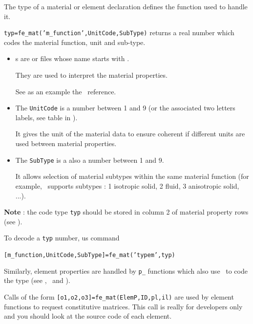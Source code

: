 
 The type of a material or element declaration defines the function used to handle it.  

{\tt typ=fe\_mat('m\_function',UnitCode,SubType)} returns a real number which codes the material function, unit and sub-type. 
\begin{itemize}
\item {}s are  or  files whose name starts with . 

They are used to interpret the material properties. 

See as an example the \melastic\ reference.

\item The {\tt UnitCode} is a number between 1 and 9 (or the associated two letters labels, see table in ). 

It gives the unit of the material data to ensure coherent if different units are used between material properties.

\item The {\tt SubType} is a also a number between 1 and 9.

It allows selection of material subtypes within the same material function (for example, \melastic\ supports subtypes : 1 isotropic solid, 2 fluid, 3 anisotropic solid, ...).

\end{itemize}

{\bf Note} : the code type {\tt typ} should be stored in column 2 of material property rows (see ).

To decode a {\tt typ} number, us command

{\tt [m\_function,UnitCode,SubType]=fe\_mat('typem',typ)}

Similarly, element properties are handled by {\tt p\_} functions which also use \femat\ to code the type (see \pbeam, \pshell\ and \psolid).


Calls of the form {\tt [o1,o2,o3]=fe\_mat(ElemP,ID,pl,il)} are used by element functions to request constitutive matrices. This call is really for developers only and you should look at the source code of each element.


